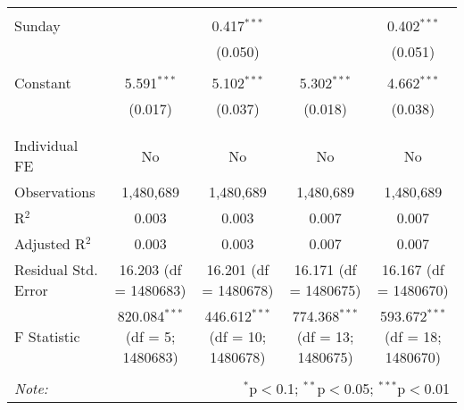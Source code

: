 \documentclass[
]{article}
\begin{document}
\begin{table}[!htbp]
{\begin{tabular}{@{\extracolsep{5pt}}lcccc}
  & & & & \\ 
 Sunday &  & 0.417$^{***}$ &  & 0.402$^{***}$ \\ 
  &  & (0.050) &  & (0.051) \\ 
  & & & & \\ 
 Constant & 5.591$^{***}$ & 5.102$^{***}$ & 5.302$^{***}$ & 4.662$^{***}$ \\ 
  & (0.017) & (0.037) & (0.018) & (0.038) \\ 
  & & & & \\ 
\hline \\[-1.8ex] 
Individual FE & No & No & No & No \\ 
Observations & 1,480,689 & 1,480,689 & 1,480,689 & 1,480,689 \\ 
R$^{2}$ & 0.003 & 0.003 & 0.007 & 0.007 \\ 
Adjusted R$^{2}$ & 0.003 & 0.003 & 0.007 & 0.007 \\ 
Residual Std. Error & 16.203 (df = 1480683) & 16.201 (df = 1480678) & 16.171 (df = 1480675) & 16.167 (df = 1480670) \\ 
F Statistic & 820.084$^{***}$ (df = 5; 1480683) & 446.612$^{***}$ (df = 10; 1480678) & 774.368$^{***}$ (df = 13; 1480675) & 593.672$^{***}$ (df = 18; 1480670) \\ 
\hline 
\hline \\[-1.8ex] 
\textit{Note:}  & \multicolumn{4}{r}{$^{*}$p$<$0.1; $^{**}$p$<$0.05; $^{***}$p$<$0.01} \\ 
\end{tabular}
} 
\end{table} 
\newpage
\end{document}
